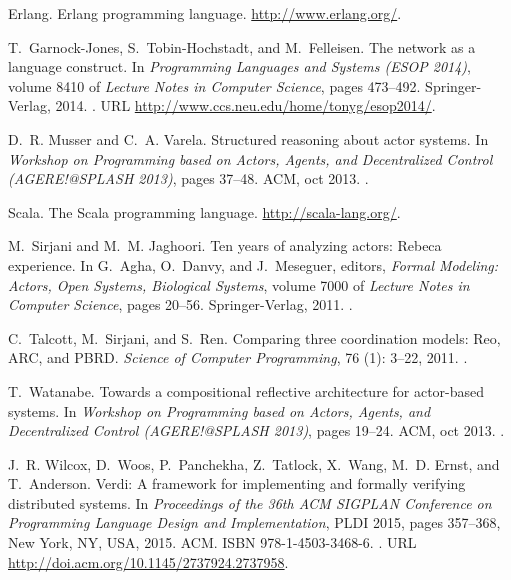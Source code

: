 \documentclass[10pt]{sigplanconf}
\begin{document}
\begin{thebibliography}{15}
Erlang.
\newblock Erlang programming language.
\newblock \url{http://www.erlang.org/}.

T.~Garnock-Jones, S.~Tobin-Hochstadt, and M.~Felleisen.
\newblock The network as a language construct.
\newblock In \emph{Programming Languages and Systems (ESOP 2014)}, volume 8410
  of \emph{Lecture Notes in Computer Science}, pages 473--492. Springer-Verlag,
  2014.
\newblock {}.
\newblock URL \url{http://www.ccs.neu.edu/home/tonyg/esop2014/}.

D.~R. Musser and C.~A. Varela.
\newblock Structured reasoning about actor systems.
\newblock In \emph{Workshop on Programming based on Actors, Agents, and
  Decentralized Control (AGERE!@SPLASH 2013)}, pages 37--48. ACM, oct 2013.
\newblock {}.

Scala.
\newblock The {Scala} programming language.
\newblock \url{http://scala-lang.org/}.

M.~Sirjani and M.~M. Jaghoori.
\newblock Ten years of analyzing actors: {Rebeca} experience.
\newblock In G.~Agha, O.~Danvy, and J.~Meseguer, editors, \emph{Formal
  Modeling: Actors, Open Systems, Biological Systems}, volume 7000 of
  \emph{Lecture Notes in Computer Science}, pages 20--56. Springer-Verlag,
  2011.
\newblock {}.

C.~Talcott, M.~Sirjani, and S.~Ren.
\newblock Comparing three coordination models: {Reo}, {ARC}, and {PBRD}.
\newblock \emph{Science of Computer Programming}, 76 (1):
  3--22, 2011.
\newblock {}.

T.~Watanabe.
\newblock Towards a compositional reflective architecture for actor-based
  systems.
\newblock In \emph{Workshop on Programming based on Actors, Agents, and
  Decentralized Control (AGERE!@SPLASH 2013)}, pages 19--24. ACM, oct 2013.
\newblock {}.

J.~R. Wilcox, D.~Woos, P.~Panchekha, Z.~Tatlock, X.~Wang, M.~D. Ernst, and
  T.~Anderson.
\newblock Verdi: A framework for implementing and formally verifying
  distributed systems.
\newblock In \emph{Proceedings of the 36th ACM SIGPLAN Conference on
  Programming Language Design and Implementation}, PLDI 2015, pages 357--368,
  New York, NY, USA, 2015. ACM.
\newblock ISBN 978-1-4503-3468-6.
\newblock {}.
\newblock URL \url{http://doi.acm.org/10.1145/2737924.2737958}.


\end{thebibliography}
\end{document}
